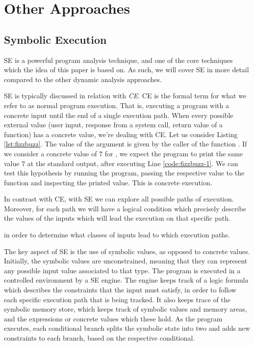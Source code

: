 \section{Other Approaches}

\subsection{Symbolic Execution}

\gls{SE} is a powerful program analysis technique, and one of the core techniques which the idea of this paper is based on. As such, we will cover \gls{SE} in more detail compared to the other dynamic analysis approaches.

\gls{SE} is typically discussed in relation with \emph{\gls{CE}}. \gls{CE} is the formal term for what we refer to as normal program execution. That is, executing a program with a concrete input until the end of a single execution path. When every possible external value (user input, response from a system call, return value of a function) has a concrete value, we're dealing with \gls{CE}.
Let us consider Listing \ref{lst:fizzbuzz}. The value of the argument  is given by the caller of the function . If we consider a concrete value of $7$ for , we expect the program to print the same value $7$ at the standard output, after executing Line \ref{code:fizzbuzz-1}. We can test this hypothesis by running the program, passing the respective value to the function and inspecting the printed value. This is concrete execution.



In contrast with \gls{CE}, with \gls{SE} we can explore all possible paths of execution. Moreover, for each path we will have a logical condition which precisely describe the values of the inputs which will lead the execution on that specific path.

in order to determine what classes of inputs lead to which execution paths.

The key aspect of \gls{SE} is the use of symbolic values, as opposed to concrete values. Initially, the symbolic values are unconstrained, meaning that they can represent any possible input value associated to that type. The program is executed in a controlled environment by a \gls{SE} engine. The engine keeps track of a logic formula which describes the constraints that the input must satisfy, in order to follow each specific execution path that is being tracked. It also keeps trace of the symbolic memory store, which keeps track of symbolic values and memory areas, and the expressions or concrete values which these hold. As the program executes, each conditional branch splits the symbolic state into two and adds new constraints to each branch, based on the respective conditional.

